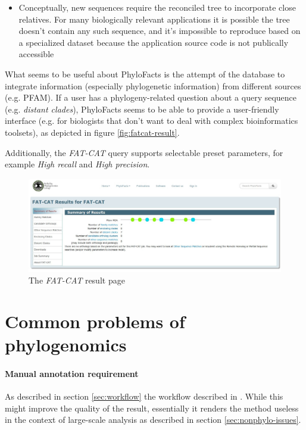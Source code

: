 \documentclass[pdftex,paper=A4,DIV=calc,titlepage,12pt]{scrartcl}
\newtheorem[L]{boxedDefinition}{Definition}
\begin{document}
\begin{itemize}
 \item Conceptually, new sequences require the reconciled tree to incorporate close relatives. For many biologically relevant applications it is possible the tree doesn't contain any such sequence, and it's impossible to reproduce based on a specialized dataset because the application source code is not publically accessible
\end{itemize}

What seems to be useful about PhyloFacts is the attempt of the database to integrate information (especially phylogenetic information) from different sources (e.g. PFAM). If a user has a phylogeny-related question about a query sequence (e.g. \textit{distant clades}), PhyloFacts seems to be able to provide a user-friendly interface (e.g. for biologists that don't want to deal with complex bioinformatics toolsets), as depicted in figure \vref{fig:fatcat-result}.

Additionally, the \textit{FAT-CAT} query supports selectable preset parameters, for example \textit{High recall} and \textit{High precision}.

\begin{figure}[ht!]
\centering
\includegraphics[width=\textwidth]{../Vortrag/figures/fatcat-results.jpg}
\caption{The \textit{FAT-CAT} result page}
\label{fig:fatcat-result}
\end{figure}

\section{Common problems of phylogenomics}\label{sec:problems}

\paragraph{Manual annotation requirement}
As described in section \vref{sec:workflow} the workflow described in \cite{sjolander2004phylogenomic}. While this might improve the quality of the result, essentially it renders the method useless in the context of large-scale analysis as described in section \vref{sec:nonphylo-issues}.
\end{document}
